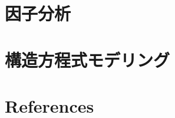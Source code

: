 \documentclass[
  a4paper,
]{ltjsbook}
\begin{document}
\section{因子分析}\label{ux56e0ux5b50ux5206ux6790}

\section{構造方程式モデリング}\label{ux69cbux9020ux65b9ux7a0bux5f0fux30e2ux30c7ux30eaux30f3ux30b0}

\section{References}\label{references-12}



\printbibliography[title=引用文献]
\end{document}
